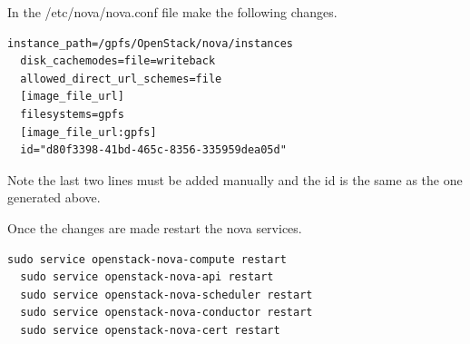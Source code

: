 In the /etc/nova/nova.conf file make the following changes.
\begin{lstlisting}[escapechar=&]
  instance_path=/gpfs/OpenStack/nova/instances
  disk_cachemodes=file=writeback
  allowed_direct_url_schemes=file
  [image_file_url]
  filesystems=gpfs
  [image_file_url:gpfs]
  id="d80f3398-41bd-465c-8356-335959dea05d"
\end{lstlisting}

Note the last two lines must be added manually and the id is the same as
the one generated above.

Once the changes are made restart the nova services.

\begin{lstlisting}[escapechar=&]
  sudo service openstack-nova-compute restart
  sudo service openstack-nova-api restart
  sudo service openstack-nova-scheduler restart
  sudo service openstack-nova-conductor restart
  sudo service openstack-nova-cert restart
\end{lstlisting}

